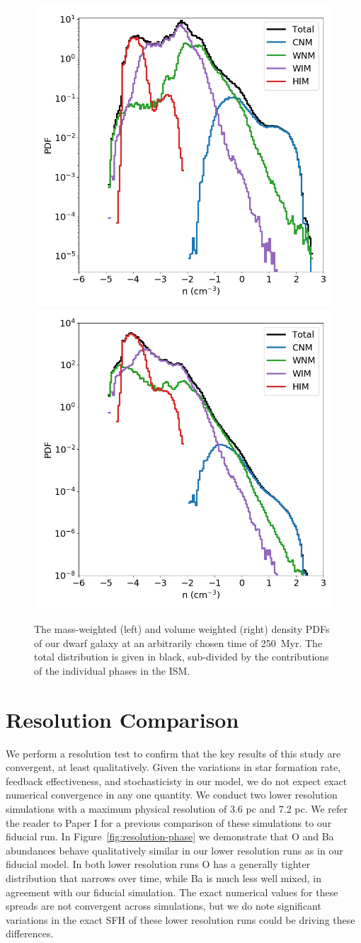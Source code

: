 \documentclass[twocolumn]{aastex61}
\begin{document}
\begin{figure}
\centering
\includegraphics[width=0.475\linewidth]{density_PDF.png} 
\includegraphics[width=0.475\linewidth]{density_PDF_volume_weighted.png}\caption{The mass-weighted (left) and volume weighted (right) density PDFs of our dwarf galaxy at an arbitrarily chosen time of 250~Myr. The total distribution is given in black, sub-divided by the contributions of the individual phases in the ISM.}
\label{fig:density_pdf}
\end{figure}

\section{Resolution Comparison}
We perform a resolution test to confirm that the key results of this study are convergent, at least qualitatively. Given the variations in star formation rate, feedback effectiveness, and stochasticisty in our model, we do not expect exact numerical convergence in any one quantity. We conduct two lower resolution simulations with a maximum physical resolution of 3.6 pc and 7.2 pc. We refer the reader to Paper I for a previous comparison of these simulations to our fiducial run. In Figure~\ref{fig:resolution-phase} we demonstrate that O and Ba abundances behave qualitatively similar in our lower resolution runs as in our fiducial model. In both lower resolution runs O has a generally tighter distribution that narrows over time, while Ba is much less well mixed, in agreement with our fiducial simulation. The exact numerical values for these spreads are not convergent across simulations, but we do note significant variations in the exact SFH of these lower resolution runs could be driving these differences.
\end{document}
